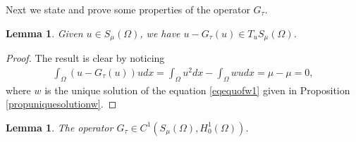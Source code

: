 \documentclass[10pt,a4paper]{article}
\newtheorem{lemma}[theorem]{Lemma}
\theoremstyle{definition} \theoremstyle{remark}
\numberwithin{equation}{section}
\begin{document}
Next we state and prove some properties of the operator $G_\tau$.

\begin{lemma} \label{lemproG1}
	Given $u \in S_\mu(\Omega)$, we have $u - G_\tau(u) \in T_uS_\mu(\Omega)$.
\end{lemma}

\begin{proof}
	The result is clear by  noticing
	\begin{align*}
		\int_\Omega (u - G_\tau(u))u dx = \int_\Omega u^2 dx - \int_\Omega wu dx = \mu - \mu = 0,
	\end{align*}
    where $w$ is the unique solution of the  equation \eqref{eqequofw1} given in Proposition \ref{propuniquesolutionw}.
\end{proof}

\begin{lemma} \label{lemproG2}
	The operator $G_\tau \in C^1(S_\mu(\Omega),H_0^1(\Omega))$.
\end{lemma}
\end{document}
